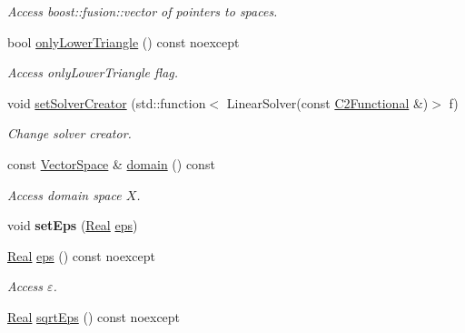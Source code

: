 \begin{DoxyCompactItemize}
\begin{DoxyCompactList}\small\item\em \-Access boost\-::fusion\-::vector of pointers to spaces. \end{DoxyCompactList}\item 
bool \hyperlink{classSpacy_1_1Kaskade_1_1C2Functional_a37152b2b1413e611d229a61318b86768}{only\-Lower\-Triangle} () const noexcept
\begin{DoxyCompactList}\small\item\em \-Access only\-Lower\-Triangle flag. \end{DoxyCompactList}\item 
void \hyperlink{classSpacy_1_1Kaskade_1_1C2Functional_a3b69bdfbeec77616425096b435573094}{set\-Solver\-Creator} (std\-::function$<$ \-Linear\-Solver(const \hyperlink{classSpacy_1_1Kaskade_1_1C2Functional}{\-C2\-Functional} \&)$>$ f)
\begin{DoxyCompactList}\small\item\em \-Change solver creator. \end{DoxyCompactList}\item 
\hypertarget{classSpacy_1_1FunctionalBase_a2d3397deb9fa1ad85ed04e37a03b3aa6}{const \hyperlink{classSpacy_1_1VectorSpace}{\-Vector\-Space} \& \hyperlink{classSpacy_1_1FunctionalBase_a2d3397deb9fa1ad85ed04e37a03b3aa6}{domain} () const }\label{classSpacy_1_1FunctionalBase_a2d3397deb9fa1ad85ed04e37a03b3aa6}

\begin{DoxyCompactList}\small\item\em \-Access domain space $X$. \end{DoxyCompactList}\item 
\hypertarget{classSpacy_1_1Mixin_1_1Eps_a6b4c38a60848c0ab665fb3a81e181786}{void {\bfseries set\-Eps} (\hyperlink{classSpacy_1_1Real}{\-Real} \hyperlink{classSpacy_1_1Mixin_1_1Eps_a812b99b0abc1d78a34b4114907f23f52}{eps})}\label{classSpacy_1_1Mixin_1_1Eps_a6b4c38a60848c0ab665fb3a81e181786}

\item 
\hypertarget{classSpacy_1_1Mixin_1_1Eps_a812b99b0abc1d78a34b4114907f23f52}{\hyperlink{classSpacy_1_1Real}{\-Real} \hyperlink{classSpacy_1_1Mixin_1_1Eps_a812b99b0abc1d78a34b4114907f23f52}{eps} () const noexcept}\label{classSpacy_1_1Mixin_1_1Eps_a812b99b0abc1d78a34b4114907f23f52}

\begin{DoxyCompactList}\small\item\em \-Access $\varepsilon$. \end{DoxyCompactList}\item 
\hypertarget{classSpacy_1_1Mixin_1_1Eps_abd50a47b32614a950189855775a09d05}{\hyperlink{classSpacy_1_1Real}{\-Real} \hyperlink{classSpacy_1_1Mixin_1_1Eps_abd50a47b32614a950189855775a09d05}{sqrt\-Eps} () const noexcept}\label{classSpacy_1_1Mixin_1_1Eps_abd50a47b32614a950189855775a09d05}


\end{DoxyCompactItemize}
